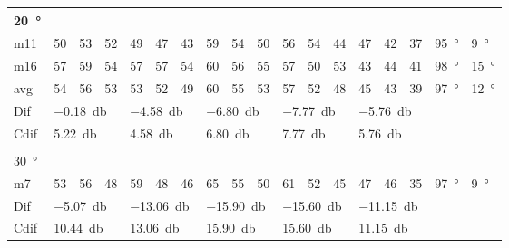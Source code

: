 \begin{table}[H]
\begin{tabular}{l|l|l|l|l|l|l|l|l|l|l|l|l|l|l|l|l|l}
\SI{20}{\degree}   & \multicolumn{3}{l|}{} & \multicolumn{3}{l|}{} & \multicolumn{3}{l|}{} & \multicolumn{3}{l|}{} &  \multicolumn{3}{l|}{}   & \multicolumn{2}{l}{}   \\  \hline
m11    & 50     &  53    &  52    &  49    & 47     &  43    &  59    &  54     &  50    &   56    &  54    &   44   & 47 & 42 & 37  & \SI{95}{\degree} & \SI{9}{\degree}   \\
m16    & 57     & 59     &  54    &  57    & 57     & 54     &   60   &  56     &  55    &  57     &  50    &  53    & 43 & 44 & 41   & \SI{98}{\degree} & \SI{15}{\degree}  \\ \hline
avg &  54    &  56    &  53    &   53   &  52    &  49    &  60    &   55    &  53    &   57    &  52    &  48    & 45 & 43  &39    & \SI{97}{\degree} & \SI{12}{\degree}  \\ \hline  
Dif & \multicolumn{3}{l|}{\SI{-0.18}{\decibel}} & \multicolumn{3}{l|}{\SI{-4.58}{\decibel}} & \multicolumn{3}{l|}{\SI{-6.80}{\decibel}} & \multicolumn{3}{l|}{\SI{-7.77}{\decibel}} & \multicolumn{3}{l|}{\SI{-5.76}{\decibel}} & \multicolumn{2}{l}{}   \\ \hline 
Cdif & \multicolumn{3}{l|}{\SI{5.22}{\decibel}} & \multicolumn{3}{l|}{\SI{4.58}{\decibel}} & \multicolumn{3}{l|}{\SI{6.80}{\decibel}} & \multicolumn{3}{l|}{\SI{7.77}{\decibel}} & \multicolumn{3}{l|}{\SI{5.76}{\decibel}}  &   \multicolumn{2}{l}{}   \\ 
 \multicolumn{18}{l}{ } \\                             
\SI{30}{\degree}   & \multicolumn{3}{l|}{} & \multicolumn{3}{l|}{} & \multicolumn{3}{l|}{} & \multicolumn{3}{l|}{} &  \multicolumn{3}{l|}{}   & \multicolumn{2}{l}{}   \\  \hline
m7    & 53     & 56     & 48     &  59    & 48     &  46    & 65     & 55      &  50    &   61    & 52     &   45   & 47 & 46 & 35   & \SI{97}{\degree} & \SI{9}{\degree}  \\ \hline
Dif & \multicolumn{3}{l|}{\SI{-5.07}{\decibel}} & \multicolumn{3}{l|}{\SI{-13.06}{\decibel}} & \multicolumn{3}{l|}{\SI{-15.90}{\decibel}} & \multicolumn{3}{l|}{\SI{-15.60}{\decibel}} & \multicolumn{3}{l|}{\SI{-11.15}{\decibel}}    & \multicolumn{2}{l}{}    \\  \hline 
Cdif & \multicolumn{3}{l|}{\SI{10.44}{\decibel}} & \multicolumn{3}{l|}{\SI{13.06}{\decibel}} & \multicolumn{3}{l|}{\SI{15.90}{\decibel}} & \multicolumn{3}{l|}{\SI{15.60}{\decibel}} & \multicolumn{3}{l|}{\SI{11.15}{\decibel}}  &   \multicolumn{2}{l}{}                       
\end{tabular}
\label{meas:result_cross_8_9}
\end{table}




